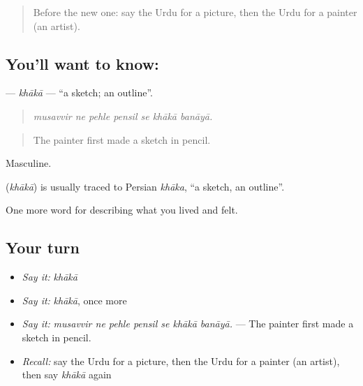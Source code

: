 \label{lesson:UR-C515-khaka}



\begin{quote}
Before the new one: say the Urdu for a picture, then the Urdu for a painter (an artist).
\end{quote}

\subsection*{You'll want to know: }
\textbf{} — \emph{khākā} — \textquotedblleft{}a sketch; an outline\textquotedblright{}.

\begin{quote}
      
\end{quote}

\begin{quote}
\emph{musavvir ne pehle pensil se khākā banāyā.}
\end{quote}

\begin{quote}
The painter first made a sketch in pencil.
\end{quote}

Masculine.

\begin{cousinweb}
\textbf{} (\emph{khākā}) is usually traced to Persian \emph{khāka}, \textquotedblleft{}a sketch, an outline\textquotedblright{}.
\end{cousinweb}

\begin{grammarlens}[title={What you've built}]
One more word for describing what you lived and felt.
\end{grammarlens}

\subsection*{Your turn}
\begin{itemize}
\raggedright
  \item \emph{Say it:} \emph{khākā}
  \item \emph{Say it:} \emph{khākā}, once more
  \item \emph{Say it:} \emph{musavvir ne pehle pensil se khākā banāyā.} — The painter first made a sketch in pencil.
  \item \emph{Recall:} say the Urdu for a picture, then the Urdu for a painter (an artist), then say \emph{khākā} again
\end{itemize}

